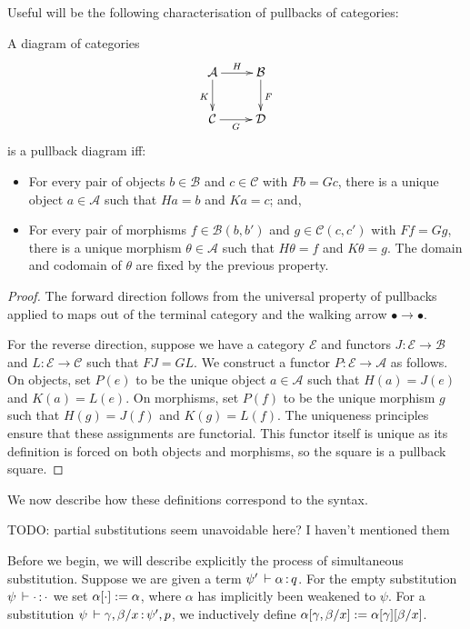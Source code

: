 Useful will be the following characterisation of pullbacks of categories:
\begin{lemma}
\label{lem:pullbacks-in-cat}
A diagram of categories
\[ \xymatrix{
    \mathcal{A} \ar[r]^-{H} \ar[d]_K & \mathcal{B} \ar[d]^F \\
    \mathcal{C} \ar[r]_-{G} & \mathcal{D}
  }\]
is a pullback diagram iff:
\begin{itemize}
\item For every pair of objects $b \in \mathcal{B}$ and $c \in \mathcal{C}$ with $Fb = Gc$, there is a unique object $a \in \mathcal{A}$ such that $Ha = b$ and $Ka = c$; and,
\item For every pair of morphisms $f \in \mathcal{B}(b,b')$ and $g \in \mathcal{C}(c,c')$ with $Ff= Gg$, there is a unique morphism $\theta \in \mathcal{A}$ such that $H\theta = f$ and $K\theta = g$. The domain and codomain of $\theta$ are fixed by the previous property.
\end{itemize}
\end{lemma}
\begin{proof}
The forward direction follows from the universal property of pullbacks applied to maps out of the terminal category and the walking arrow $\bullet \to \bullet$.

For the reverse direction, suppose we have a category $\mathcal{E}$ and functors $J : \mathcal{E} \to \mathcal{B}$ and $L : \mathcal{E} \to \mathcal{C}$ such that $FJ = GL$. We construct a functor $P : \mathcal{E} \to \mathcal{A}$ as follows. On objects, set $P(e)$ to be the unique object $a \in \mathcal{A}$ such that $H(a) = J(e)$ and $K(a) = L(e)$. On morphisms, set $P(f)$ to be the unique morphism $g$ such that $H(g) = J(f)$ and $K(g) = L(f)$. The uniqueness principles ensure that these assignments are functorial. This functor itself is unique as its definition is forced on both objects and morphisms, so the square is a pullback square.
\end{proof}

We now describe how these definitions correspond to the syntax.

TODO: partial substitutions seem unavoidable here? I haven't mentioned them

Before we begin, we will describe explicitly the process of simultaneous substitution. Suppose we are given a term $\psi' \, \vdash \alpha \, \mathit{:} \, q$. For the empty substitution $\psi \, \vdash \cdot \, \mathit{:} \, \cdot$ we set $\alpha[\cdot] := \alpha$, where $\alpha$ has implicitly been weakened to $\psi$. For a substitution $\psi \, \vdash \gamma, \beta/x \, \mathit{:} \, \psi', p$, we inductively define $\alpha[\gamma, \beta/x] := \alpha[\gamma][\beta/x]$.

